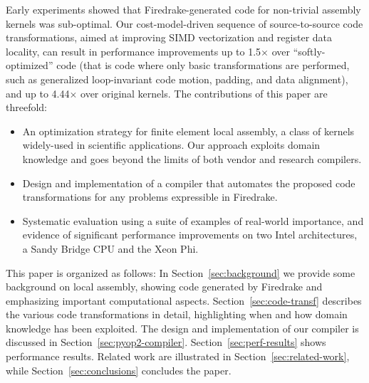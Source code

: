 \documentclass[conference]{IEEEtran}
\begin{document}

Early experiments showed that Firedrake-generated code for non-trivial assembly kernels was sub-optimal. Our cost-model-driven sequence of source-to-source code transformations, aimed at improving SIMD vectorization and register data locality, can result in performance improvements up to 1.5$\times$ over ``softly-optimized'' code (that is code where only basic transformations are performed, such as generalized loop-invariant code motion, padding, and data alignment), and up to 4.44$\times$ over original kernels. The contributions of this paper are threefold:
\begin{itemize}
\item An optimization strategy for finite element local assembly, a class of kernels widely-used in scientific applications. Our approach exploits domain knowledge and goes beyond the limits of both vendor and research compilers.
\item Design and implementation of a compiler that automates the proposed code transformations for any problems expressible in Firedrake.
\item Systematic evaluation using a suite of examples of real-world importance, and evidence of significant performance improvements on two Intel architectures, a Sandy Bridge CPU and the Xeon Phi.
\end{itemize}

This paper is organized as follows: In Section~\ref{sec:background} we provide some background on local assembly, showing code generated by Firedrake and emphasizing important computational aspects. Section~\ref{sec:code-transf} describes the various code transformations in detail, highlighting when and how domain knowledge has been exploited. The design and implementation of our compiler is discussed in Section~\ref{sec:pyop2-compiler}. Section~\ref{sec:perf-results} shows performance results. Related work are illustrated in Section~\ref{sec:related-work}, while Section~\ref{sec:conclusions} concludes the paper.


\end{document}
